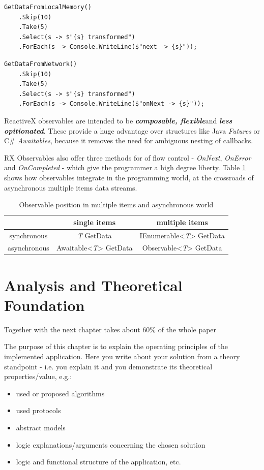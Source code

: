\documentclass[12pt,a4paper,twoside]{report}
\begin{document}
\begin{lstlisting}[caption=Iterable, label=alg:iterable]
  GetDataFromLocalMemory()
    .Skip(10)
    .Take(5)
    .Select(s -> $"{s} transformed")
    .ForEach(s -> Console.WriteLine($"next -> {s}"));
\end{lstlisting}

\begin{lstlisting}[caption=Observable, label=alg:observable]
  GetDataFromNetwork()
    .Skip(10)
    .Take(5)
    .Select(s -> $"{s} transformed")
    .ForEach(s -> Console.WriteLine($"onNext -> {s}"));
\end{lstlisting}

ReactiveX observables are intended to be \textbf{\textit{composable, flexible}}and \textbf{\textit{less opitionated}}. These provide a huge advantage over structures like Java \textit{Futures} or C\# \textit{Awaitables}, because it removes the need for ambiguous nesting of callbacks.

RX Observables also offer three methods for of flow control - \textit{OnNext}, \textit{OnError} and \textit{OnCompleted} - which give the programmer a high degree liberty. Table \ref{table:rx} shows how observables integrate in the programming world, at the crossroads of asynchronous multiple items data streams.

\begin{table}[h]
  \centering
  \begin{tabular}{c | c | c}
    & single items & multiple items \\
    \hline
    synchronous & \textit{T} GetData & IEnumerable<\textit{T}> GetData \\
    asynchronous & Awaitable<\textit{T}> GetData & Observable<\textit{T}> GetData
  \end{tabular}
  \caption{Observable position in multiple items and asynchronous world}
  \label{table:rx}
\end{table}

\chapter{Analysis and Theoretical Foundation}
\label{ch:analysis}

Together with the next chapter takes about 60\% of the whole paper

The purpose of this chapter is to explain the operating principles of the implemented application.
Here you write about your solution from a theory standpoint - i.e. you explain it and you demonstrate its theoretical properties/value, e.g.:
\begin{itemize}
 \item used or proposed algorithms
 \item used protocols
 \item abstract models
 \item logic explanations/arguments concerning the chosen solution
 \item logic and functional structure of the application, etc.
\end{itemize}
\end{document}
